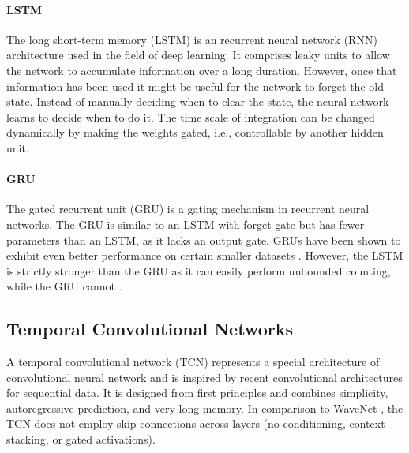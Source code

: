 \documentclass{scrartcl}
\begin{document}
\paragraph{LSTM}
The long short-term memory (LSTM) \cite{Hochreiter1997} is an recurrent neural network (RNN) architecture used in the field of deep learning. It comprises leaky units to allow the network to accumulate information over a long duration. However, once that information has been used it might be useful for the network to forget the old state. Instead of manually deciding when to clear the state, the neural network learns to decide when to do it. The time scale of integration can be changed dynamically by making the weights gated, i.e., controllable by another hidden unit.

\paragraph{GRU}
The gated recurrent unit (GRU) \cite{Cho2014} is a gating mechanism in recurrent neural networks. The GRU is similar to an LSTM with forget gate but has fewer parameters than an LSTM, as it lacks an output gate. GRUs have been shown to exhibit even better performance on certain smaller datasets \cite{Chung2014}. However, the LSTM is strictly stronger than the GRU as it can easily perform unbounded counting, while the GRU cannot \cite{Weiss2018}.








\subsection{Temporal Convolutional Networks}

A temporal convolutional network (TCN) \cite{Bai2018} represents a special architecture of convolutional neural network and is inspired by recent convolutional architectures for sequential data. It is designed from first principles and combines simplicity, autoregressive prediction, and very long memory. In comparison to WaveNet \cite{Oord2016}, the TCN does not employ skip connections across layers (no conditioning, context stacking, or gated activations).
\end{document}
